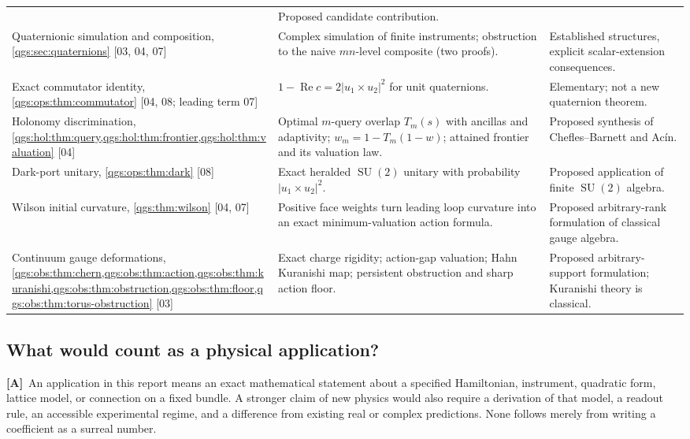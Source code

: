 \documentclass[11pt,oneside]{article}
\numberwithin{equation}{section}
\theoremstyle{plain}
\theoremstyle{definition}
\theoremstyle{remark}
\DeclareMathOperator{\Rea}{Re}
\DeclareMathOperator{\SU}{SU}
\newcommand{\abs}[1]{\left|#1\right|}
\newcommand{\TA}{\textcolor{TierA}{\textsf{\bfseries[A]}}}
\newcommand{\src}[1]{{\small\textsf{[#1]}}}
\begin{document}
\begin{longtable}{@{}L{0.24\textwidth}L{0.41\textwidth}L{0.24\textwidth}@{}}
& Proposed candidate contribution.\\[3pt]
Quaternionic simulation and composition, \cref{qgs:sec:quaternions} \src{03, 04, 07}
& Complex simulation of finite instruments; obstruction to the naive $mn$-level composite (two proofs).
& Established structures, explicit scalar-extension consequences.\\[3pt]
Exact commutator identity, \cref{qgs:ops:thm:commutator} \src{04, 08; leading term 07}
& $1-\Rea c=2\abs{u_1\times u_2}^2$ for unit quaternions.
& Elementary; not a new quaternion theorem.\\[3pt]
Holonomy discrimination, \cref{qgs:hol:thm:query,qgs:hol:thm:frontier,qgs:hol:thm:valuation} \src{04}
& Optimal $m$-query overlap $T_m(s)$ with ancillas and adaptivity; $w_m=1-T_m(1-w)$; attained frontier and its valuation law.
& Proposed synthesis of Chefles--Barnett and Ac\'in.\\[3pt]
Dark-port unitary, \cref{qgs:ops:thm:dark} \src{08}
& Exact heralded $\SU(2)$ unitary with probability $\abs{u_1\times u_2}^2$.
& Proposed application of finite $\SU(2)$ algebra.\\[3pt]
Wilson initial curvature, \cref{qgs:thm:wilson} \src{04, 07}
& Positive face weights turn leading loop curvature into an exact minimum-valuation action formula.
& Proposed arbitrary-rank formulation of classical gauge algebra.\\[3pt]
Continuum gauge deformations, \cref{qgs:obs:thm:chern,qgs:obs:thm:action,qgs:obs:thm:kuranishi,qgs:obs:thm:obstruction,qgs:obs:thm:floor,qgs:obs:thm:torus-obstruction} \src{03}
& Exact charge rigidity; action-gap valuation; Hahn Kuranishi map; persistent obstruction and sharp action floor.
& Proposed arbitrary-support formulation; Kuranishi theory is classical.\\
\end{longtable}

\subsection{What would count as a physical application?}
\TA\ An application in this report means an exact mathematical statement about a specified Hamiltonian, instrument, quadratic form, lattice model, or connection on a fixed bundle. A stronger claim of new physics would also require a derivation of that model, a readout rule, an accessible experimental regime, and a difference from existing real or complex predictions. None follows merely from writing a coefficient as a surreal number.
\end{document}
